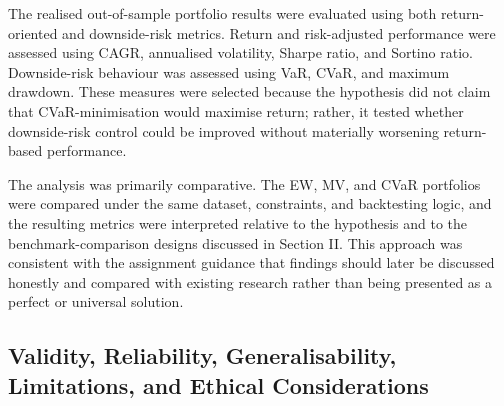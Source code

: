 \par The realised out-of-sample portfolio results were evaluated using both return-oriented and downside-risk metrics. Return and risk-adjusted performance were assessed using CAGR, annualised volatility, Sharpe ratio, and Sortino ratio. Downside-risk behaviour was assessed using VaR, CVaR, and maximum drawdown. These measures were selected because the hypothesis did not claim that CVaR-minimisation would maximise return; rather, it tested whether downside-risk control could be improved without materially worsening return-based performance.
\par The analysis was primarily comparative. The EW, MV, and CVaR portfolios were compared under the same dataset, constraints, and backtesting logic, and the resulting metrics were interpreted relative to the hypothesis and to the benchmark-comparison designs discussed in Section II. This approach was consistent with the assignment guidance that findings should later be discussed honestly and compared with existing research rather than being presented as a perfect or universal solution.

\subsection{Validity, Reliability, Generalisability, Limitations, and Ethical Considerations}

